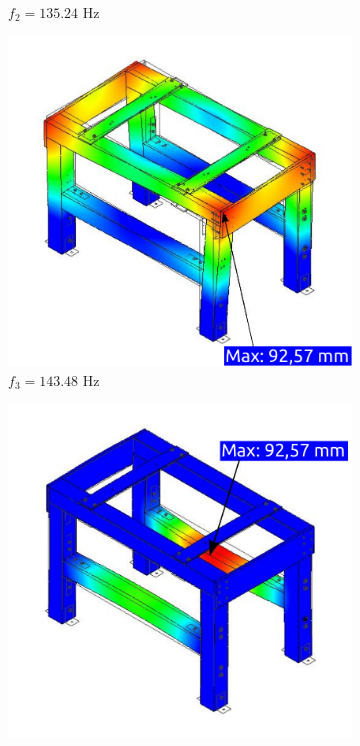 \begin{figure}[]
\begin{subfigure}{0.5\linewidth}
		\caption{$f_2 = 135.24$ Hz}\label{fig:frecuencia_2}
	\end{subfigure}
		\begin{subfigure}{0.5\linewidth}
		\centering
		\includegraphics[width=0.9\linewidth]{Imagenes/F3.pdf}
		\caption{$f_3 = 143.48$ Hz}\label{fig:frecuencia_3}
	\end{subfigure}%
	\begin{subfigure}{0.5\linewidth}
		\centering
		\includegraphics[width=0.9\linewidth]{Imagenes/F4.pdf}

\end{subfigure}
\end{figure}
